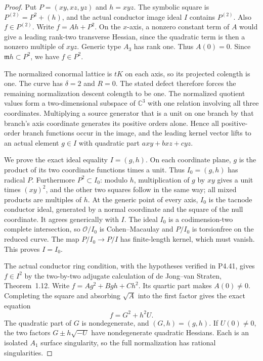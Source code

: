 \begin{proof}
Put $P=(xy,xz,yz)$ and $h=xyz$. The symbolic square is
$P^{(2)}=P^2+(h)$, and the actual conductor image ideal
$I$ contains $P^{(2)}$. Also $f\in P^{(2)}$.
Write $f=Ah+P^2$. On the $x$-axis, a nonzero constant
term of $A$ would give a leading rank-two transverse
Hessian, since the quadratic term is then a nonzero
multiple of $xyz$. Generic type $A_3$ has rank one.
Thus $A(0)=0$. Since $\mathfrak m h\subset P^2$,
we have $f\in P^2$.

The normalized conormal lattice is $tK$ on each axis,
so its projected colength is one. The curve has
$\delta=2$ and $R=0$. The stated defect therefore
forces the remaining normalization descent colength
to be one. The normalized quotient values form a
two-dimensional subspace of $\mathbb C^3$ with one
relation involving all three coordinates. Multiplying
a source generator that is a unit on one branch by
that branch's axis coordinate generates its positive
orders alone. Hence all positive-order branch functions
occur in the image, and the leading kernel vector
lifts to an actual element $g\in I$ with quadratic
part $a xy+b xz+c yz$.

We prove the exact ideal equality $I=(g,h)$.
On each coordinate plane, $g$ is the product of its
two coordinate functions times a unit. Thus
$I_0=(g,h)$ has radical $P$. Furthermore $P^2\subset I_0$:
modulo $h$, multiplication of $g$ by $xy$ gives a unit
times $(xy)^2$, and the other two squares follow in
the same way; all mixed products are multiples of $h$.
At the generic point of every axis, $I_0$ is the
tacnode conductor ideal, generated by a normal coordinate
and the square of the null coordinate. It agrees
generically with $I$. The ideal $I_0$ is a
codimension-two complete intersection, so
$\mathcal O/I_0$ is Cohen--Macaulay and $P/I_0$ is
torsionfree on the reduced curve. The map
$P/I_0\to P/I$ has finite-length kernel, which must
vanish. This proves $I=I_0$.

The actual conductor ring condition, with the hypotheses
verified in P4.41, gives $f\in I^2$ by the two-by-two
adjugate calculation of de Jong--van Straten,
Theorem~1.12. Write $f=A g^2+Bgh+Ch^2$.
Its quartic part makes $A(0)\ne0$. Completing the square
and absorbing $\sqrt A$ into the first factor gives
the exact equation
\[
                         f=G^2+h^2U.                 \tag{4.47a}
\]
The quadratic part of $G$ is nondegenerate, and
$(G,h)=(g,h)$. If $U(0)\ne0$, the two factors
$G\pm h\sqrt{-U}$ have nondegenerate quadratic
Hessians. Each is an isolated $A_1$ surface singularity,
so the full normalization has rational singularities.


\end{proof}
